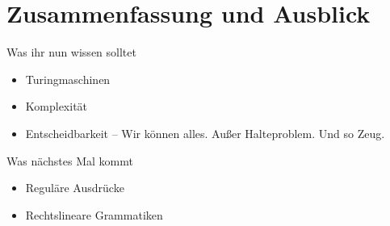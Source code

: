 \appendix
\beginbackup

\section{Zusammenfassung und Ausblick}

\begin{frame}
	\begin{block}{Was ihr nun wissen solltet}
		\begin{itemize}
			\item Turingmaschinen
			\item Komplexität
			\item Entscheidbarkeit -- Wir können alles. Außer Halteproblem. Und so Zeug.
		\end{itemize}
	\end{block}
	
	\begin{block}{Was nächstes Mal kommt}
		\begin{itemize}
			\item Reguläre Ausdrücke
			\item Rechtslineare Grammatiken
		\end{itemize}
	\end{block}
\end{frame}







{}

\backupend
